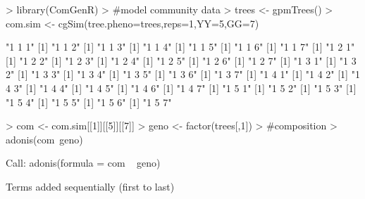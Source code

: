 \documentclass[12pt]{article}
\begin{document}
\begin{Schunk}
\begin{Sinput}
> library(ComGenR)
>                                         #model community data
> trees <- gpmTrees()
> com.sim <- cgSim(tree.pheno=trees,reps=1,YY=5,GG=7)
\end{Sinput}
\begin{Soutput}
[1] "1 1 1"
[1] "1 1 2"
[1] "1 1 3"
[1] "1 1 4"
[1] "1 1 5"
[1] "1 1 6"
[1] "1 1 7"
[1] "1 2 1"
[1] "1 2 2"
[1] "1 2 3"
[1] "1 2 4"
[1] "1 2 5"
[1] "1 2 6"
[1] "1 2 7"
[1] "1 3 1"
[1] "1 3 2"
[1] "1 3 3"
[1] "1 3 4"
[1] "1 3 5"
[1] "1 3 6"
[1] "1 3 7"
[1] "1 4 1"
[1] "1 4 2"
[1] "1 4 3"
[1] "1 4 4"
[1] "1 4 5"
[1] "1 4 6"
[1] "1 4 7"
[1] "1 5 1"
[1] "1 5 2"
[1] "1 5 3"
[1] "1 5 4"
[1] "1 5 5"
[1] "1 5 6"
[1] "1 5 7"
\end{Soutput}
\begin{Sinput}
> com <- com.sim[[1]][[5]][[7]]
> geno <- factor(trees[,1])
>                                         #composition
> adonis(com~geno)
\end{Sinput}
\begin{Soutput}
Call:
adonis(formula = com ~ geno) 

Terms added sequentially (first to last)


\end{Soutput}
\end{Schunk}
\end{document}

